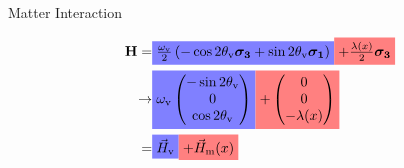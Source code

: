 \begin{frame}{Matter Interaction}

\begin{align*}
    \mathbf H =& \colorbox{blue!50}{$ \frac{\omega_{\mathrm{v}}}{2}\left( - \cos 2\theta_{\mathrm{v}} \boldsymbol{\sigma_3} + \sin 2\theta_{\mathrm{v}} \boldsymbol{\sigma_1} \right) $}   \colorbox{red!50}{$ + \frac{\lambda(x)}{2} \boldsymbol{\sigma_3} $} \\
    \to &  \colorbox{blue!50}{$ \omega_{\mathrm v}\begin{pmatrix}
    - \sin 2\theta_{\mathrm v} \\
    0 \\
    \cos 2\theta_{\mathrm v}
\end{pmatrix} $}  \colorbox{red!50}{$ + \begin{pmatrix}
    0\\
    0\\
    - \lambda(x)
    \end{pmatrix} $} \\
    = &  \colorbox{blue!50}{$ \vec H_{\mathrm v} $}  \colorbox{red!50}{$ + \vec H_{\mathrm m}(x) $}
\end{align*}






\end{frame}




